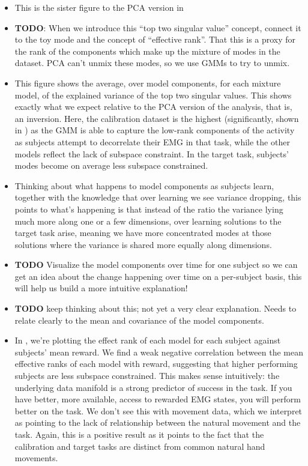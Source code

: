 \documentclass[../main.tex]{subfiles}
\begin{document}
\begin{itemize}
  \setlength\itemsep{0em}
  \item This is the sister figure to the PCA version in 
  \item \textbf{TODO}: When we introduce this ``top two singular value'' concept, connect it to the toy mode  and the concept of ``effective rank''. That this is a proxy for the rank of the components which make up the mixture of modes in the dataset. PCA can't unmix these modes, so we use GMMs to try to unmix.
  \item This figure shows the average, over model components, for each mixture model, of the explained variance of the top two singular values. This shows exactly what we expect relative to the PCA version of the analysis, that is, an inversion. Here, the calibration dataset is the highest (significantly, shown in ) as the GMM is able to capture the low-rank components of the activity as subjects attempt to decorrelate their EMG in that task, while the other models reflect the lack of subspace constraint. In the target task, subjects' modes become on average less subspace constrained. 
  \item Thinking about what happens to model components as subjects learn, together with the knowledge that over learning we see variance dropping, this points to what's happening is that instead of the ratio the variance lying much more along one or a few dimensions, over learning solutions to the target task arise, meaning we have more concentrated modes at those solutions where the variance is shared more equally along dimensions. 
  \item \textbf{TODO} Visualize the model components over time for one subject so we can get an idea about the change happening over time on a per-subject basis, this will help us build a more intuitive explanation!
  \item \textbf{TODO} keep thinking about this; not yet a very clear explanation. Needs to relate clearly to the mean and covariance of the model components.
  \item In , we're plotting the effect rank of each model for each subject against subjects' mean reward. We find a weak negative correlation between the mean effective ranks of each model with reward, suggesting that higher performing subjects are less subspace constrained. This makes sense intuitively: the underlying data manifold is a strong predictor of success in the task. If you have better, more available, access to rewarded EMG states, you will perform better on the task. We don't see this with movement data, which we interpret as pointing to the lack of relationship between the natural movement and the task. Again, this is a positive result as it points to the fact that the calibration and target tasks are distinct from common natural hand movements.

\end{itemize}
\end{document}
